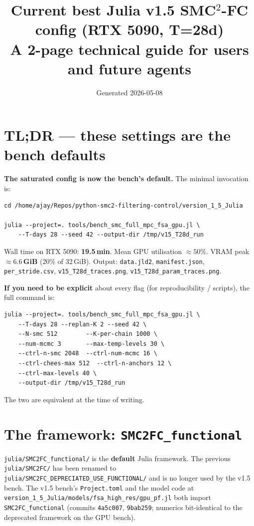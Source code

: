 \documentclass[11pt,a4paper]{article}
\title{\textbf{Current best Julia v1.5 SMC$^2$-FC config (RTX 5090, T=28d)}\\
       \large A 2-page technical guide for users and future agents}
\author{Generated 2026-05-08}
\date{}
\begin{document}
\maketitle

\section*{TL;DR — these settings are the bench defaults}

\textbf{The saturated config is now the bench's default.} The minimal
invocation is:

\begin{verbatim}
cd /home/ajay/Repos/python-smc2-filtering-control/version_1_5_Julia

julia --project=. tools/bench_smc_full_mpc_fsa_gpu.jl \
    --T-days 28 --seed 42 --output-dir /tmp/v15_T28d_run
\end{verbatim}

\noindent Wall time on RTX 5090: \textbf{19.5\,min}. Mean GPU
utilisation \textbf{$\approx 50\%$}. VRAM peak \textbf{$\approx
6.6$\,GiB} (20\% of 32\,GiB). Output: \texttt{data.jld2},
\texttt{manifest.json}, \texttt{per\_stride.csv},
\texttt{v15\_T28d\_traces.png}, \texttt{v15\_T28d\_param\_traces.png}.

\textbf{If you need to be explicit} about every flag (for
reproducibility / scripts), the full command is:

\begin{verbatim}
julia --project=. tools/bench_smc_full_mpc_fsa_gpu.jl \
    --T-days 28 --replan-K 2 --seed 42 \
    --N-smc 512        --K-per-chain 1000 \
    --num-mcmc 3       --max-temp-levels 30 \
    --ctrl-n-smc 2048  --ctrl-num-mcmc 16 \
    --ctrl-chees-max 512  --ctrl-n-anchors 12 \
    --ctrl-max-levels 40 \
    --output-dir /tmp/v15_T28d_run
\end{verbatim}

The two are equivalent at the time of writing.

\section*{The framework: \texttt{SMC2FC\_functional}}

\texttt{julia/SMC2FC\_functional/} is the \textbf{default} Julia
framework. The previous \texttt{julia/SMC2FC/} has been renamed to
\texttt{julia/SMC2FC\_DEPRECIATED\_USE\_FUNCTIONAL/} and is no longer
used by the v1.5 bench. The v1.5 bench's \texttt{Project.toml}
and the model code at
\texttt{version\_1\_5\_Julia/models/fsa\_high\_res/gpu\_pf.jl} both
import \texttt{SMC2FC\_functional} (commits \texttt{4a5c007},
\texttt{9bab259}; numerics bit-identical to the deprecated framework
on the GPU bench).
\end{document}

